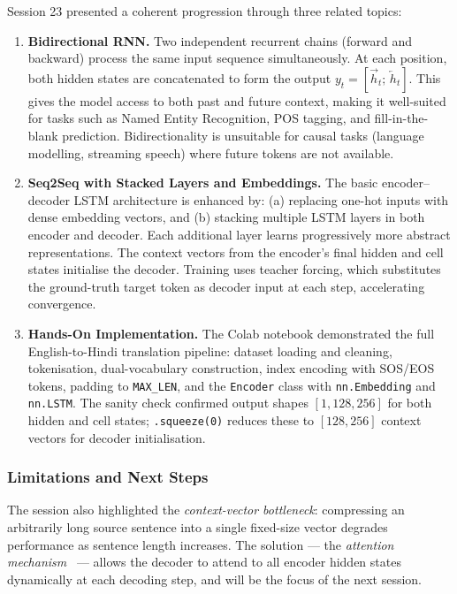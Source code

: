 \documentclass[12pt,a4paper]{article}
\begin{document}
Session 23 presented a coherent progression through three related topics:

\begin{enumerate}
  \item \textbf{Bidirectional RNN.}  Two independent recurrent chains (forward
        and backward) process the same input sequence simultaneously.  At each
        position, both hidden states are concatenated to form the output
        $y_t = [\overrightarrow{h}_t;\,\overleftarrow{h}_t]$.  This gives the
        model access to both past and future context, making it well-suited for
        tasks such as Named Entity Recognition, POS tagging, and fill-in-the-blank
        prediction.  Bidirectionality is unsuitable for causal tasks (language
        modelling, streaming speech) where future tokens are not available.

  \item \textbf{Seq2Seq with Stacked Layers and Embeddings.}  The basic
        encoder--decoder LSTM architecture is enhanced by: (a) replacing
        one-hot inputs with dense embedding vectors, and (b) stacking multiple
        LSTM layers in both encoder and decoder.  Each additional layer learns
        progressively more abstract representations.  The context vectors from
        the encoder's final hidden and cell states initialise the decoder.
        Training uses teacher forcing, which substitutes the ground-truth target
        token as decoder input at each step, accelerating convergence.

  \item \textbf{Hands-On Implementation.}  The Colab notebook demonstrated the
        full English-to-Hindi translation pipeline: dataset loading and cleaning,
        tokenisation, dual-vocabulary construction, index encoding with SOS/EOS
        tokens, padding to \texttt{MAX\_LEN}, and the \texttt{Encoder} class
        with \texttt{nn.Embedding} and \texttt{nn.LSTM}.  The sanity check
        confirmed output shapes $[1, 128, 256]$ for both hidden and cell states;
        \texttt{.squeeze(0)} reduces these to $[128, 256]$ context vectors for
        decoder initialisation.
\end{enumerate}

\subsubsection*{Limitations and Next Steps}

The session also highlighted the \emph{context-vector bottleneck}: compressing
an arbitrarily long source sentence into a single fixed-size vector degrades
performance as sentence length increases.  The solution --- the \emph{attention
mechanism}~\cite{bahdanau2015neural} --- allows the decoder to attend to all
encoder hidden states dynamically at each decoding step, and will be the focus
of the next session.
\end{document}
